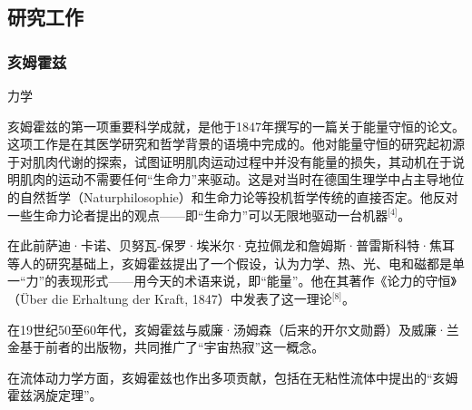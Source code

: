 \subsection{研究工作}
\subsubsection{亥姆霍兹}
力学

亥姆霍兹的第一项重要科学成就，是他于1847年撰写的一篇关于能量守恒的论文。这项工作是在其医学研究和哲学背景的语境中完成的。他对能量守恒的研究起初源于对肌肉代谢的探索，试图证明肌肉运动过程中并没有能量的损失，其动机在于说明肌肉的运动不需要任何“生命力”来驱动。这是对当时在德国生理学中占主导地位的自然哲学（Naturphilosophie）和生命力论等投机哲学传统的直接否定。他反对一些生命力论者提出的观点——即“生命力”可以无限地驱动一台机器\(^\text{[4]}\)。

在此前萨迪·卡诺、贝努瓦-保罗·埃米尔·克拉佩龙和詹姆斯·普雷斯科特·焦耳等人的研究基础上，亥姆霍兹提出了一个假设，认为力学、热、光、电和磁都是单一“力”的表现形式——用今天的术语来说，即“能量”。他在其著作《论力的守恒》（Über die Erhaltung der Kraft, 1847）中发表了这一理论\(^\text{[8]}\)。

在19世纪50至60年代，亥姆霍兹与威廉·汤姆森（后来的开尔文勋爵）及威廉·兰金基于前者的出版物，共同推广了“宇宙热寂”这一概念。

在流体动力学方面，亥姆霍兹也作出多项贡献，包括在无粘性流体中提出的“亥姆霍兹涡旋定理”。

